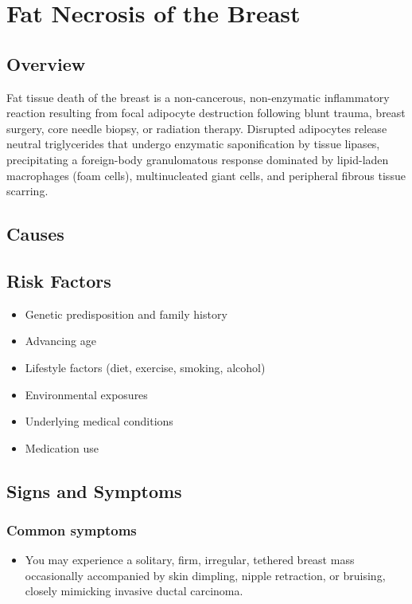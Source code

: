 \chapter{Fat Necrosis of the Breast}
\label{sec:Fat Necrosis of the Breast}

\section{Overview}
Fat tissue death of the breast is a non-cancerous, non-enzymatic inflammatory reaction resulting from focal adipocyte destruction following blunt trauma, breast surgery, core needle biopsy, or radiation therapy. Disrupted adipocytes release neutral triglycerides that undergo enzymatic saponification by tissue lipases, precipitating a foreign-body granulomatous response dominated by lipid-laden macrophages (foam cells), multinucleated giant cells, and peripheral fibrous tissue scarring.
\section{Causes}
\section{Risk Factors}

\begin{itemize}[noitemsep]
  \item Genetic predisposition and family history
  \item Advancing age
  \item Lifestyle factors (diet, exercise, smoking, alcohol)
  \item Environmental exposures
  \item Underlying medical conditions
  \item Medication use
\end{itemize}
\section{Signs and Symptoms}

\subsection{Common symptoms}
\begin{itemize}[noitemsep]
  \item You may experience a solitary, firm, irregular, tethered breast mass occasionally accompanied by skin dimpling, nipple retraction, or bruising, closely mimicking invasive ductal carcinoma. 
  \end{itemize}

